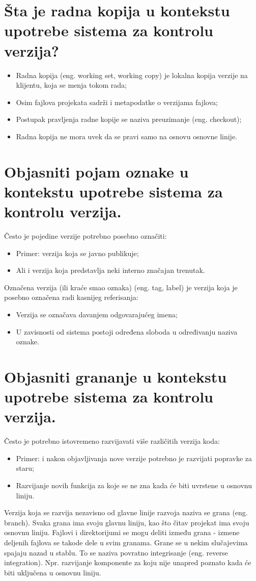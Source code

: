 \documentclass[a4paper]{article}
\begin{document}
\section{Šta je radna kopija u kontekstu upotrebe sistema za kontrolu verzija?}
  \begin{itemize}
    \item Radna kopija (eng. working set, working copy) je lokalna kopija verzije na klijentu, 
          koja se menja tokom rada;
    \item Osim fajlova projekata sadrži i metapodatke o verzijama fajlova;
    \item Postupak pravljenja radne kopije se naziva preuzimanje (eng. checkout);
    \item Radna kopija ne mora uvek da se pravi samo na osnovu osnovne linije.
  \end{itemize}
\section{Objasniti pojam oznake u kontekstu upotrebe sistema za kontrolu verzija.}
  Često je pojedine verzije potrebno posebno označiti:
  \begin{itemize}
    \item Primer: verzija koja se javno publikuje;
    \item Ali i verzija koja predstavlja neki interno značajan trenutak.
  \end{itemize}
  Označena verzija (ili kraće smao oznaka) (eng. tag, label) je verzija koja je posebno 
  označena radi kasnijeg referisanja:
  \begin{itemize}
    \item Verzija se označava davanjem odgovarajućeg imena;
    \item U zavisnosti od sistema postoji određena sloboda u određivanju naziva oznake.
  \end{itemize}
  
\section{Objasniti grananje u kontekstu upotrebe sistema za kontrolu verzija.}
  Često je potrebno istovremeno razvijavati više različitih verzija koda:
  \begin{itemize}
    \item Primer: i nakon objavljivanja nove verzije potrebno je razvijati popravke za staru;
    \item Razvijanje novih funkcija za koje se ne zna kada će biti uvrstene u osnovnu liniju.
  \end{itemize}
  Verzija koja se razvija nezavisno od glavne linije razvoja naziva se grana (eng. branch). 
  Svaka grana ima svoju glavnu liniju, kao što čitav projekat ima svoju osnovnu liniju. 
  Fajlovi i direktorijumi se mogu deliti između grana - izmene deljenih fajlova se takode dele u 
  svim granama. Grane se u nekim slučajevima spajaju nazad u stablu. To se naziva povratno 
  integrisanje (eng. reverse integration). Npr. razvijanje komponente za koju nije unapred 
  poznato kada će biti uključena u osnovnu liniju.
\end{document}
